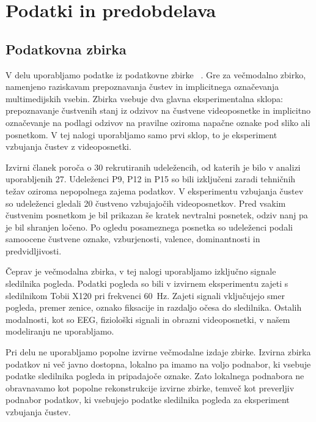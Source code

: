 \chapter{Podatki in predobdelava}
\label{sec:podatki}

\section{Podatkovna zbirka \MAHNOB{}}
\label{subsec:podatkovna-zbirka}

V delu uporabljamo podatke iz podatkovne zbirke \MAHNOB{}~\cite{soleymani2012mahnob}.
Gre za večmodalno zbirko, namenjeno raziskavam prepoznavanja čustev in implicitnega označevanja multimedijskih vsebin.
Zbirka vsebuje dva glavna eksperimentalna sklopa: prepoznavanje čustvenih stanj iz odzivov na čustvene videoposnetke in implicitno označevanje na podlagi odzivov na pravilne oziroma napačne oznake pod sliko ali posnetkom.
V tej nalogi uporabljamo samo prvi sklop, to je eksperiment vzbujanja čustev z videoposnetki.

Izvirni članek poroča o 30 rekrutiranih udeležencih, od katerih je bilo v analizi uporabljenih 27.
Udeleženci P9, P12 in P15 so bili izključeni zaradi tehničnih težav oziroma nepopolnega zajema podatkov.
V eksperimentu vzbujanja čustev so udeleženci gledali 20 čustveno vzbujajočih videoposnetkov.
Pred vsakim čustvenim posnetkom je bil prikazan še kratek nevtralni posnetek, odziv nanj pa je bil shranjen ločeno.
Po ogledu posameznega posnetka so udeleženci podali samoocene čustvene oznake, vzburjenosti, valence, dominantnosti in predvidljivosti.

Čeprav je \MAHNOB{} večmodalna zbirka, v tej nalogi uporabljamo izključno signale sledilnika pogleda.
Podatki pogleda so bili v izvirnem eksperimentu zajeti s sledilnikom Tobii X120 pri frekvenci 60~Hz.
Zajeti signali vključujejo smer pogleda, premer zenice, oznako fiksacije in razdaljo očesa do sledilnika.
Ostalih modalnosti, kot so EEG, fiziološki signali in obrazni videoposnetki, v našem modeliranju ne uporabljamo.

Pri delu ne uporabljamo popolne izvirne večmodalne izdaje zbirke.
Izvirna zbirka podatkov ni več javno dostopna, lokalno pa imamo na voljo podnabor, ki vsebuje podatke sledilnika pogleda in pripadajoče oznake.
Zato lokalnega podnabora ne obravnavamo kot popolne rekonstrukcije izvirne zbirke, temveč kot preverljiv podnabor \MAHNOB{} podatkov, ki vsebujejo podatke sledilnika pogleda za eksperiment vzbujanja čustev.

